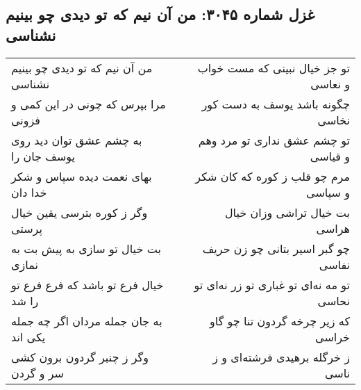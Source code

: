 \begin{center}
\section*{غزل شماره ۳۰۴۵: من آن نیم که تو دیدی چو بینیم نشناسی}
\label{sec:3045}
\begin{longtable}{l p{0.5cm} r}
من آن نیم که تو دیدی چو بینیم نشناسی
&&
تو جز خیال نبینی که مست خواب و نعاسی
\\
مرا بپرس که چونی در این کمی و فزونی
&&
چگونه باشد یوسف به دست کور نخاسی
\\
به چشم عشق توان دید روی یوسف جان را
&&
تو چشم عشق نداری تو مرد وهم و قیاسی
\\
بهای نعمت دیده سپاس و شکر خدا دان
&&
مرم چو قلب ز کوره که کان شکر و سپاسی
\\
وگر ز کوره بترسی یقین خیال پرستی
&&
بت خیال تراشی وزان خیال هراسی
\\
بت خیال تو سازی به پیش بت به نمازی
&&
چو گبر اسیر بتانی چو زن حریف نفاسی
\\
خیال فرع تو باشد که فرع فرع تو را شد
&&
تو مه نه‌ای تو غباری تو زر نه‌ای تو نحاسی
\\
به جان جمله مردان اگر چه جمله یکی اند
&&
که زیر چرخه گردون تنا چو گاو خراسی
\\
وگر ز چنبر گردون برون کشی سر و گردن
&&
ز خرگله برهیدی فرشته‌ای و ز ناسی
\\
\end{longtable}
\end{center}
